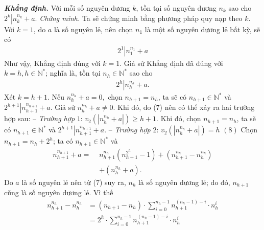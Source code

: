 \begin{multicols}{2}
	\vskip 0.05cm
	\textbf{\color{thachthuctoanhoc}\textit{Khẳng định.}} Với mỗi số nguyên dương $k$, tồn tại số nguyên dương  $n_k$ sao cho ${2^k}\left| {n_k^{{n_k}} + a} \right..$
	\vskip 0.05cm 
	\textit{Chứng minh.} Ta sẽ chứng minh bằng phương pháp quy nạp theo $k$.
	\vskip 0.05cm
	Với $k = 1$, do $a$ là số nguyên lẻ, nên chọn $n_1$  là một số nguyên dương lẻ bất kỳ, sẽ có
	\begin{align*}
		{2^1}\left| {n_1^{{n_1}} + a} \right.
	\end{align*}
	Như vậy, Khẳng định đúng với $k = 1$.
	\vskip 0.05cm
	Giả sử Khẳng định đã đúng với $k = h, h \in \mathbb{N^*}$;  nghĩa là, tồn tại $n_h \in\mathbb{N^*}$  sao cho
	\begin{align*}
		{2^h}\left| {n_h^{{n_h}} + a} \right.. \tag{$7$}
	\end{align*}
	Xét $k = h + 1$.
	\vskip 0.05cm
	Nếu $n_h^{{n_h}} + a = 0,$  chọn  ${n_{h + 1}} = {n_h}$, ta sẽ có ${n_{h + 1}} \in \mathbb{N^*}$  và  ${2^{h + 1}}\left| {n_{h + 1}^{{n_{h + 1}}} + a} \right.$.
	\vskip 0.05cm
	Giả sử $n_h^{{n_h}} + a \ne 0.$  Khi đó, do ($7$) nên có thể xảy ra hai trường hợp sau:
	\vskip 0.05cm
	-- \textit{Trường hợp} $1$: ${v_2}\left( {\left| {n_h^{{n_h}} + a} \right|} \right) \ge h + 1.$
	\vskip 0.05cm  
	Khi đó, chọn  ${n_{h + 1}} = {n_h}$, ta sẽ có ${n_{h + 1}} \in \mathbb{N^*}$   và  ${2^{h + 1}}\left| {n_{h + 1}^{{n_{h + 1}}} + a} \right.$.
	\vskip 0.05cm
	-- \textit{Trường hợp} $2$:  ${v_2}\left( {\left| {n_h^{{n_h}} + a} \right|} \right) = h$                                                                                                        \hfill $(8)$
	\vskip 0.05cm
	Chọn  ${n_{h + 1}} = {n_h} + {2^h}$; ta có  ${n_{h + 1}} \in \mathbb{N^*}$  và
	\begin{align*}
		n_{h + 1}^{{n_{h + 1}}} + a = \,\,&n_{h + 1}^{{n_h}}\left( {n_{h + 1}^{{2^h}} - 1} \right) + \left( {n_{h + 1}^{{n_h}} - n_h^{{n_h}}} \right) \\
		&+ \left( {n_h^{{n_h}} + a} \right). \tag{$9$}
	\end{align*}
	Do $a$ là số nguyên lẻ nên từ ($7$) suy ra, $n_h$  là số nguyên dương lẻ; do đó, $n_{h+1}$  cũng là số nguyên dương lẻ. Vì thế
	\begin{align*}
		n_{h + 1}^{{n_h}} - n_h^{{n_h}} &= \left( {{n_{h + 1}} - {n_h}} \right) \cdot \sum\limits_{i = 0}^{{n_h} - 1} {n_{h + 1}^{\left( {{n_h} - 1} \right) - i} \cdot n_h^i}  \\
		&= {2^h} \cdot \sum\limits_{i = 0}^{{n_h} - 1} {n_{h + 1}^{\left( {{n_h} - 1} \right) - i} \cdot n_h^i}
	\end{align*}

\end{multicols}
